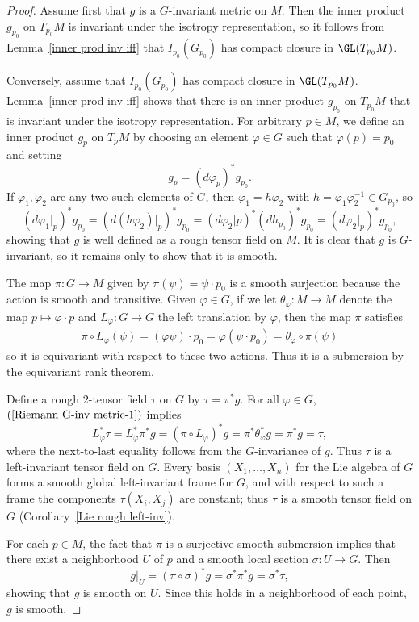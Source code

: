 \begin{proof}
Assume first that $g$ is a $G$-invariant metric on $M$. Then the inner product $g_{p_0}$ on 
$T_{p_0}M$ is invariant under the isotropy representation, so it follows from Lemma~\ref{inner prod inv iff} 
that $I_{p_0}(G_{p_0})$ has compact closure in $\GL(T_{p_0}M)$.\par
Conversely, assume that $I_{p_0}(G_{p_0})$ has compact closure in $\GL(T_{p_0}M)$. Lemma~\ref{inner prod inv iff} 
shows that there is an inner product $g_{p_0}$ on $T_{p_0}M$ that is invariant under the 
isotropy representation. For arbitrary $p\in M$, we define an inner product $g_p$ on $T_pM$ 
by choosing an element $\varphi\in G$ such that $\varphi(p)=p_0$ and setting
\[g_p=(d\varphi_p)^*g_{p_0}.\]
If $\varphi_1,\varphi_2$ are any two such elements of $G$, then $\varphi_1=h\varphi_2$ with $h=\varphi_1\varphi_2^{-1}\in G_{p_0}$, so
\[(d\varphi_1|_p)^*g_{p_0}=(d(h\varphi_2)|_p)^*g_{p_0}=(d\varphi_2|p)^*(dh_{p_0})^*g_{p_0}=(d\varphi_2|_p)^*g_{p_0},\]
showing that $g$ is well defined as a rough tensor field on $M$. It is clear that $g$ is $G$-invariant, 
so it remains only to show that it is smooth.\par
The map $\pi:G\to M$ given by $\pi(\psi)=\psi\cdot p_0$ is a smooth surjection because the action 
is smooth and transitive. Given $\varphi\in G$, if we let $\theta_\varphi:M\to M$ denote the 
map $p\mapsto\varphi\cdot p$ and $L_\varphi:G\to G$ the left translation by $\varphi$, then 
the map $\pi$ satisfies
\begin{align}\label{Riemann G-inv metric-1}
\pi\circ L_{\varphi}(\psi)=(\varphi\psi)\cdot p_0=\varphi(\psi\cdot p_0)=\theta_{\varphi}\circ\pi(\psi)
\end{align}so it is equivariant with respect to these two actions. Thus it is a submersion by the equivariant 
rank theorem.\par
Define a rough $2$-tensor field $\tau$ on $G$ by $\tau=\pi^*g$. For all $\varphi\in G$, $(\ref{Riemann G-inv metric-1})$ 
implies
\[L_{\varphi}^*\tau=L_{\varphi}^*\pi^*g=(\pi\circ L_{\varphi})^*g=\pi^*\theta_{\varphi}^*g=\pi^*g=\tau,\]
where the next-to-last equality follows from the $G$-invariance of $g$. Thus $\tau$ is a 
left-invariant tensor field on $G$. Every basis $(X_1,\dots,X_n)$ for the Lie algebra of $G$ 
forms a smooth global left-invariant frame for $G$, and with respect to such a frame the 
components $\tau(X_i,X_j)$ are constant; thus $\tau$ is a smooth tensor field on $G$ (Corollary~\ref{Lie rough left-inv}).\par
For each $p\in M$, the fact that $\pi$ is a surjective smooth submersion implies that there 
exist a neighborhood $U$ of $p$ and a smooth local section $\sigma:U\to G$. Then
\[g|_{U}=(\pi\circ\sigma)^*g=\sigma^*\pi^*g=\sigma^*\tau,\]
showing that $g$ is smooth on $U$. Since this holds in a neighborhood of each point, $g$ is 
smooth.
\end{proof}
